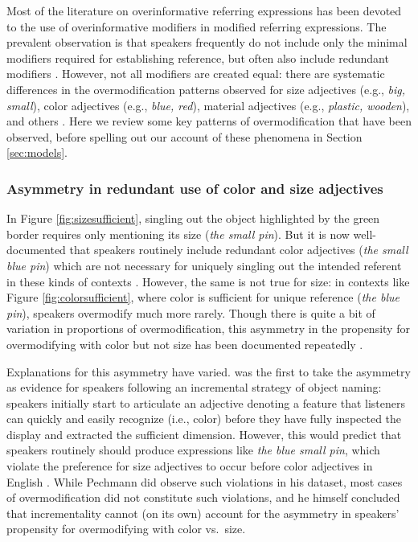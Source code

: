 \documentclass[11pt]{article}
\newcommand{\figref}[1]{Figure \ref{#1}}
\newcommand{\sectionref}[1]{Section \ref{#1}}
\begin{document}
Most of the literature on overinformative referring expressions has been devoted to the use of overinformative modifiers in modified referring expressions. The prevalent observation is that speakers frequently do not include only the minimal modifiers required for establishing reference, but often also include redundant modifiers \cite{Pechmann1989, nadig2002, Maes2004, Engelhardt2006, Arts2011, Koolen2011}. However, not all modifiers are created equal: there are systematic differences in the overmodification patterns observed for size adjectives (e.g., \emph{big, small}), color adjectives (e.g., \emph{blue, red}), material adjectives (e.g., \emph{plastic, wooden}), and others \cite{sedivy2003a}. Here we review some key patterns of overmodification that have been observed, before spelling out our account of these phenomena in \sectionref{sec:models}.



\subsubsection{Asymmetry in redundant use of color and size adjectives}
\label{sec:asymmetry}

 In \figref{fig:sizesufficient}, singling out the object highlighted by the green border requires only mentioning its size (\emph{the small pin}). But it is now well-documented that speakers routinely include redundant color adjectives (\emph{the small blue pin}) which are not necessary for uniquely singling out the intended referent in these kinds of contexts \cite{Pechmann1989, Belke2002, gatt2011}. However, the same is not true for size: in contexts like \figref{fig:colorsufficient}, where color is sufficient for unique reference (\emph{the blue pin}), speakers overmodify much more rarely. Though there is quite a bit of variation in proportions of overmodification, this asymmetry in the propensity for overmodifying with color but not size has been documented repeatedly \cite{Pechmann1989, sedivy2003a,gatt2011, rubiofernandez2016,Westerbeek2015,Koolen2013}. 
 

Explanations for this asymmetry have varied.  was the first to take the asymmetry as evidence for speakers following an incremental strategy of object naming: speakers initially start to articulate an adjective denoting a feature that listeners can quickly and easily recognize (i.e., color) before they have fully inspected the display and extracted the sufficient dimension. However, this would predict that speakers routinely should produce expressions like \emph{the blue small pin}, which violate the preference for size adjectives to occur before color adjectives in English \cite{bloomfield1933, sproat1991}. While Pechmann did observe such violations in his dataset, most cases of overmodification did not constitute such violations, and he himself concluded that incrementality cannot (on its own) account for the asymmetry in speakers' propensity for overmodifying with color vs.~size. 
\end{document}
